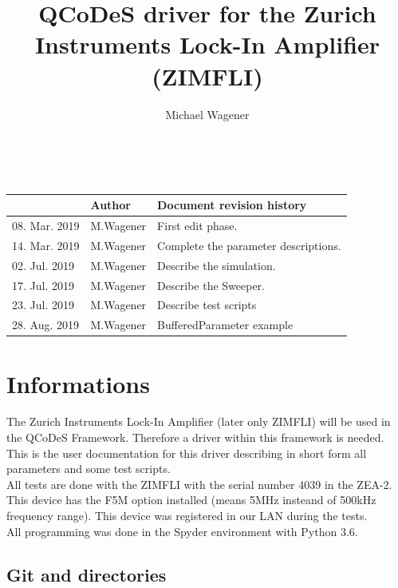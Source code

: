 \documentclass[11pt]{article} %
\title{QCoDeS driver for the Zurich Instruments Lock-In Amplifier (ZIMFLI)}
\author{Michael Wagener}
\begin{document}
\maketitle

\tableofcontents %

\ \\

\begin{longtable}{|p{2.7cm}|p{2.6cm}|p{10.3cm}|}
\hline\rowcolor{rowcolor}{\bf Date} & {\bf Author} & {\bf Document revision history} \\
\endfirsthead
\hline
08. Mar. 2019 & M.Wagener & First edit phase. \\ \hline
14. Mar. 2019 & M.Wagener & Complete the parameter descriptions. \\ \hline
02. Jul. 2019 & M.Wagener & Describe the simulation. \\ \hline
17. Jul. 2019 & M.Wagener & Describe the Sweeper. \\ \hline
23. Jul. 2019 & M.Wagener & Describe test scripts \\ \hline
28. Aug. 2019 & M.Wagener & BufferedParameter example \\ \hline
\end{longtable}


\clearpage

\section{Informations}

The Zurich Instruments Lock-In Amplifier (later only ZIMFLI) will be used in the QCoDeS Framework. Therefore a driver within this framework is needed. This is the user documentation for this driver describing in short form all parameters and some test scripts. \\[0.5em]
%
All tests are done with the ZIMFLI with the serial number 4039 in the ZEA-2. This device has the F5M option installed (means 5MHz insteand of 500kHz frequency range). This device was registered in our LAN during the tests. \\[0.5em]
%
All programming was done in the Spyder environment with Python 3.6.

\subsection{Git and directories}
\end{document}
